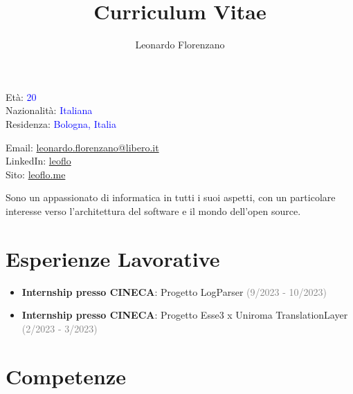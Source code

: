 \documentclass{paper}
\title{Curriculum Vitae}
\author{Leonardo Florenzano}
\begin{document}
\maketitle

\begin{multicols}{2}

\noindent
Età: \textcolor{blue}{20}\\
Nazionalità: \textcolor{blue}{Italiana}\\
Residenza: \textcolor{blue}{Bologna, Italia}

\columnbreak

\noindent
Email: \href{mailto:leonardo.florenzano@libero.it}{leonardo.florenzano@libero.it}\\
LinkedIn: \href{https://www.linkedin.com/in/leoflo}{leoflo}\\
Sito: \href{https://leoflo.me}{leoflo.me}

\end{multicols}

\noindent
Sono un appassionato di informatica in tutti i suoi aspetti, con un particolare interesse verso l'architettura del software e il mondo dell'open source.

\section{Esperienze Lavorative}

\begin{itemize}
    \item \textbf{Internship presso CINECA}: Progetto LogParser \textcolor{gray}{(9/2023 - 10/2023)}
    \item \textbf{Internship presso CINECA}: Progetto Esse3 x Uniroma TranslationLayer \textcolor{gray}{(2/2023 - 3/2023)}
\end{itemize}

\section{Competenze}
\end{document}
